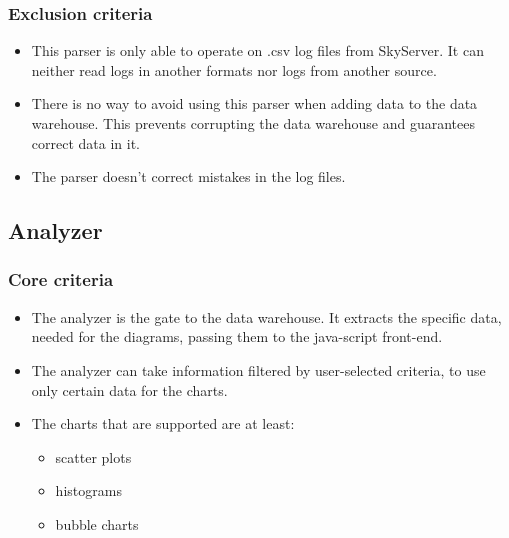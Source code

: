  
\subsubsection{Exclusion criteria}
\begin{itemize}
\item This \gls{parser} is only able to operate on \gls{.csv} \glspl{log file} from \gls{SkyServer}. 
It can neither read logs in another formats nor logs from another source.

\item There is no way to avoid using this \gls{parser} when adding data to the \gls{data warehouse}. 
This prevents corrupting the \gls{data warehouse} and guarantees correct data in it.

\item The \gls{parser} doesn't correct mistakes in the \glspl{log file}.
\end{itemize}



\subsection{Analyzer}

\subsubsection{Core criteria}
\begin{itemize}
\item The analyzer is the gate to the data warehouse. It extracts the specific data, 
needed for the diagrams, passing them to the java-script front-end.
\item The analyzer can take information filtered by user-selected criteria, 
to use only certain data for the charts.
\item The charts that are supported are at least:
\begin{itemize}
\item \glspl{scatter plot}
\item \glspl{histogram}
\item \glspl{bubble chart}
\end{itemize}

\end{itemize}

